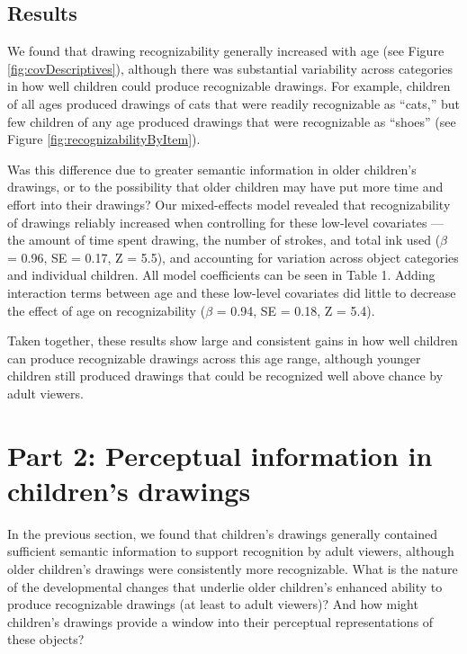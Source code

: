 \documentclass[10pt, letterpaper]{article}
\begin{document}
\subsection{Results}\label{results}

We found that drawing recognizability generally increased with age (see
Figure \ref{fig:covDescriptives}), although there was substantial
variability across categories in how well children could produce
recognizable drawings. For example, children of all ages produced
drawings of cats that were readily recognizable as ``cats,'' but few
children of any age produced drawings that were recognizable as
``shoes'' (see Figure \ref{fig:recognizabilityByItem}).

Was this difference due to greater semantic information in older
children's drawings, or to the possibility that older children may have
put more time and effort into their drawings? Our mixed-effects model
revealed that recognizability of drawings reliably increased when
controlling for these low-level covariates --- the amount of time spent
drawing, the number of strokes, and total ink used (\(\beta\) = 0.96, SE
= 0.17, Z = 5.5), and accounting for variation across object categories
and individual children. All model coefficients can be seen in Table 1.
Adding interaction terms between age and these low-level covariates did
little to decrease the effect of age on recognizability (\(\beta\) =
0.94, SE = 0.18, Z = 5.4).

Taken together, these results show large and consistent gains in how
well children can produce recognizable drawings across this age range,
although younger children still produced drawings that could be
recognized well above chance by adult viewers.

\section{Part 2: Perceptual information in children's
drawings}\label{part-2-perceptual-information-in-childrens-drawings}

In the previous section, we found that children's drawings generally
contained sufficient semantic information to support recognition by
adult viewers, although older children's drawings were consistently more
recognizable. What is the nature of the developmental changes that
underlie older children's enhanced ability to produce recognizable
drawings (at least to adult viewers)? And how might children's drawings
provide a window into their perceptual representations of these objects?
\end{document}

